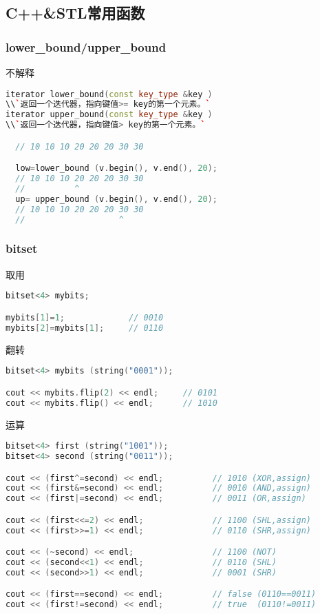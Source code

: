 \subsection{C++\&STL常用函数}
    \subsubsection{lower\_bound/upper\_bound}
	不解释\\
	\begin{lstlisting}[language=c++]
iterator lower_bound(const key_type &key )
\\`返回一个迭代器，指向键值>= key的第一个元素。`
iterator upper_bound(const key_type &key )
\\`返回一个迭代器，指向键值> key的第一个元素。`

  // 10 10 10 20 20 20 30 30

  low=lower_bound (v.begin(), v.end(), 20);           
  // 10 10 10 20 20 20 30 30
  //          ^
  up= upper_bound (v.begin(), v.end(), 20);           
  // 10 10 10 20 20 20 30 30
  //                   ^
	\end{lstlisting}
	
    \subsubsection{bitset}
	取用\\
	\begin{lstlisting}[language=c++]
bitset<4> mybits;

mybits[1]=1;             // 0010
mybits[2]=mybits[1];     // 0110
	\end{lstlisting}
	翻转\\
	\begin{lstlisting}[language=c++]
bitset<4> mybits (string("0001"));

cout << mybits.flip(2) << endl;     // 0101
cout << mybits.flip() << endl;      // 1010
	\end{lstlisting}
	运算\\
	\begin{lstlisting}[language=c++]
bitset<4> first (string("1001"));
bitset<4> second (string("0011"));

cout << (first^=second) << endl;          // 1010 (XOR,assign)
cout << (first&=second) << endl;          // 0010 (AND,assign)
cout << (first|=second) << endl;          // 0011 (OR,assign)

cout << (first<<=2) << endl;              // 1100 (SHL,assign)
cout << (first>>=1) << endl;              // 0110 (SHR,assign)

cout << (~second) << endl;                // 1100 (NOT)
cout << (second<<1) << endl;              // 0110 (SHL)
cout << (second>>1) << endl;              // 0001 (SHR)

cout << (first==second) << endl;          // false (0110==0011)
cout << (first!=second) << endl;          // true  (0110!=0011)
	\end{lstlisting}
	
